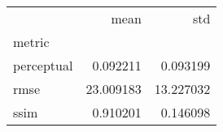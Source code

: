 \begin{tabular}{lrr}
\toprule
{} &       mean &        std \\
metric     &            &            \\
\midrule
perceptual &   0.092211 &   0.093199 \\
rmse       &  23.009183 &  13.227032 \\
ssim       &   0.910201 &   0.146098 \\
\bottomrule
\end{tabular}
